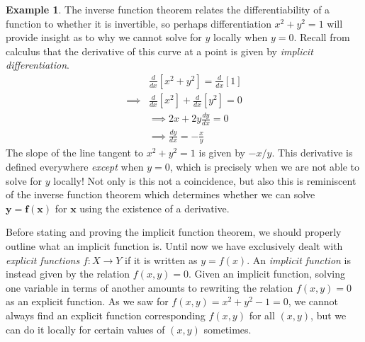 \documentclass{article}
\newcommand{\x}{\mathbf{x}}
\newcommand{\f}{\mathbf{f}}
\newcommand{\y}{\mathbf{y}}
\theoremstyle{definition}
\newtheorem{example}{Example}[section]
\begin{document}
\begin{example}
		The inverse function theorem relates the differentiability of a function to whether it is invertible, so perhaps differentiation $ x^2+y^2=1 $ will provide insight as to why we cannot solve for $ y $ locally when $ y= 0 $. Recall from calculus that the derivative of this curve at a point is given by \textit{\color{red}implicit differentiation}.
		\begin{align*}
			&\frac{d}{dx}[x^2+y^2]=\frac{d}{dx}[1]\\
			\implies & \frac{d}{dx}[x^2]+ \frac{d}{dx} [y^2]=0 \\
			& \implies 2x + 2y \frac{dy}{dx} = 0\\
			&\implies \frac{dy}{dx}=-\frac{x}{y}
		\end{align*} 
		The slope of the line tangent to $ x^2+y^2=1 $ is given by $ -x/y $. This derivative is defined everywhere \textit{except} when $ y=0 $, which is precisely when we are not able to solve for $ y $ locally! Not only is this not a coincidence, but also this is reminiscent of the inverse function theorem which determines whether we can solve $ \y=\f(\x) $ for $ \x $ using the existence of a derivative. 
	\end{example}  
	Before stating and proving the implicit function theorem, we should properly outline what an implicit function is. Until now we have exclusively dealt with \textit{\color{red}explicit functions} $ f:X\to Y $ if it is written as $ y=f(x) $. An \textit{\color{red}implicit function} is instead given by the relation $ f(x,y)=0 $. Given an implicit function, solving one variable in terms of another amounts to rewriting the relation $ f(x,y)=0 $ as an explicit function. As we saw for $ f(x,y) = x^2+y^2-1=0 $, we cannot always find an explicit function corresponding $ f(x,y) $ for all $ (x,y) $, but we can do it locally for certain values of $ (x,y) $ sometimes. 
\end{document}
